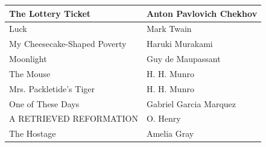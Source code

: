 \documentclass[11pt]{article}
\begin{document}
\begin{longtable}{l|l}
  The Lottery Ticket                                & Anton Pavlovich Chekhov    \\ \hline
  Luck                                              & Mark Twain                 \\ \hline
  My Cheesecake-Shaped Poverty                      & Haruki Murakami            \\ \hline
  Moonlight                                         & Guy de Maupassant          \\ \hline
  The Mouse                                         & H. H. Munro                \\ \hline
  Mrs. Packletide's Tiger                           & H. H. Munro                \\ \hline
  One of These Days                                 & Gabriel Garcia Marquez     \\ \hline
  A RETRIEVED REFORMATION                           & O. Henry                   \\ \hline
  The Hostage                                       & Amelia Gray                \\ \hline
  \end{longtable}
\end{document}
